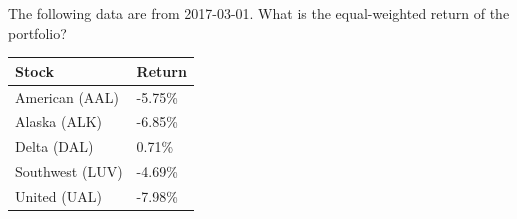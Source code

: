 The following data are from 2017-03-01. What is the equal-weighted return of the portfolio?
\begin{center}
	\begin{tabular}{l|l}
		\textbf{Stock} & \textbf{Return} \\ \hline
		American (AAL) & -5.75\% \\
		Alaska (ALK) & -6.85\% \\
		Delta (DAL) & 0.71\% \\
		Southwest (LUV) & -4.69\% \\
		United (UAL) & -7.98\%\\\hline
	\end{tabular}
\end{center}
